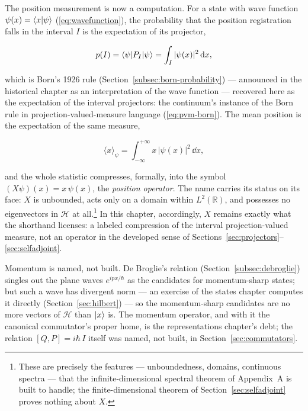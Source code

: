 The position measurement is now a computation. For a state with wave function $\psi(x) = \braket{x|\psi}$ (\eqref{eq:wavefunction}), the probability that the position registration falls in the interval $I$ is the expectation of its projector,
\begin{linenomath}
    \begin{equation}
        p(I) = \braket{\psi|P_I|\psi} = \int_I |\psi(x)|^2\,\mathrm{d} x ,
        \label{eq:position-born}
    \end{equation}
\end{linenomath}
which is Born's 1926 rule (Section~\ref{subsec:born-probability}) --- announced in the historical chapter as an interpretation of the wave function --- recovered here as the expectation of the interval projectors: the continuum's instance of the Born rule in projection-valued-measure language (\eqref{eq:pvm-born}). The mean position is the expectation of the same measure,
\begin{linenomath}
    \begin{equation}
        \langle x\rangle_\psi = \int_{-\infty}^{+\infty} x\,|\psi(x)|^2\,\dd x ,
        \label{eq:position-expectation}
    \end{equation}
\end{linenomath}
and the whole statistic compresses, formally, into the symbol $(X\psi)(x) = x\,\psi(x)$, the \emph{position operator}. The name carries its status on its face: $X$ is unbounded, acts only on a domain within $L^2(\mathbb{R})$, and possesses no eigenvectors in $\mathcal{H}$ at all.\footnote{These are precisely the features --- unboundedness, domains, continuous spectra --- that the infinite-dimensional spectral theorem of Appendix~A is built to handle; the finite-dimensional theorem of Section~\ref{sec:selfadjoint} proves nothing about $X$.} In this chapter, accordingly, $X$ remains exactly what the shorthand licenses: a labeled compression of the interval projection-valued measure, not an operator in the developed sense of Sections~\ref{sec:projectors}--\ref{sec:selfadjoint}.

Momentum is named, not built. De Broglie's relation (Section~\ref{subsec:debroglie}) singles out the plane waves $e^{ipx/\hbar}$ as the candidates for momentum-sharp states; but such a wave has divergent norm --- an exercise of the states chapter computes it directly (Section~\ref{sec:hilbert}) --- so the momentum-sharp candidates are no more vectors of $\mathcal{H}$ than $\ket{x}$ is. The momentum operator, and with it the canonical commutator's proper home, is the representations chapter's debt; the relation $[Q,P] = i\hbar\,I$ itself was named, not built, in Section~\ref{sec:commutators}.

